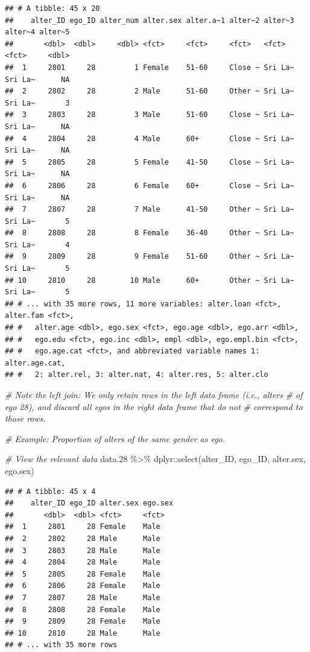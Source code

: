\documentclass[
]{book}
\newenvironment{Shaded}{\begin{snugshade}}{\end{snugshade}}
\newcommand{\CommentTok}[1]{\textcolor[rgb]{0.56,0.35,0.01}{\textit{#1}}}
\newcommand{\FloatTok}[1]{\textcolor[rgb]{0.00,0.00,0.81}{#1}}
\newcommand{\FunctionTok}[1]{\textcolor[rgb]{0.00,0.00,0.00}{#1}}
\newcommand{\NormalTok}[1]{#1}
\newcommand{\SpecialCharTok}[1]{\textcolor[rgb]{0.00,0.00,0.00}{#1}}
\begin{document}
\begin{verbatim}
## # A tibble: 45 x 20
##    alter_ID ego_ID alter_num alter.sex alter.a~1 alter~2 alter~3 alter~4 alter~5
##       <dbl>  <dbl>     <dbl> <fct>     <fct>     <fct>   <fct>   <fct>     <dbl>
##  1     2801     28         1 Female    51-60     Close ~ Sri La~ Sri La~      NA
##  2     2802     28         2 Male      51-60     Other ~ Sri La~ Sri La~       3
##  3     2803     28         3 Male      51-60     Close ~ Sri La~ Sri La~      NA
##  4     2804     28         4 Male      60+       Close ~ Sri La~ Sri La~      NA
##  5     2805     28         5 Female    41-50     Close ~ Sri La~ Sri La~      NA
##  6     2806     28         6 Female    60+       Close ~ Sri La~ Sri La~      NA
##  7     2807     28         7 Male      41-50     Other ~ Sri La~ Sri La~       5
##  8     2808     28         8 Female    36-40     Other ~ Sri La~ Sri La~       4
##  9     2809     28         9 Female    51-60     Other ~ Sri La~ Sri La~       5
## 10     2810     28        10 Male      60+       Other ~ Sri La~ Sri La~       5
## # ... with 35 more rows, 11 more variables: alter.loan <fct>, alter.fam <fct>,
## #   alter.age <dbl>, ego.sex <fct>, ego.age <dbl>, ego.arr <dbl>,
## #   ego.edu <fct>, ego.inc <dbl>, empl <dbl>, ego.empl.bin <fct>,
## #   ego.age.cat <fct>, and abbreviated variable names 1: alter.age.cat,
## #   2: alter.rel, 3: alter.nat, 4: alter.res, 5: alter.clo
\end{verbatim}

\begin{Shaded}
\begin{Highlighting}[]
\CommentTok{\# Note the left join: We only retain rows in the left data frame (i.e., alters}
\CommentTok{\# of ego 28), and discard all egos in the right data frame that do not}
\CommentTok{\# correspond to those rows.}

\CommentTok{\# Example: Proportion of alters of the same gender as ego.}

\CommentTok{\# View the relevant data}
\NormalTok{data}\FloatTok{.28} \SpecialCharTok{\%\textgreater{}\%} 
\NormalTok{  dplyr}\SpecialCharTok{::}\FunctionTok{select}\NormalTok{(alter\_ID, ego\_ID, alter.sex, ego.sex)}
\end{Highlighting}
\end{Shaded}

\begin{verbatim}
## # A tibble: 45 x 4
##    alter_ID ego_ID alter.sex ego.sex
##       <dbl>  <dbl> <fct>     <fct>  
##  1     2801     28 Female    Male   
##  2     2802     28 Male      Male   
##  3     2803     28 Male      Male   
##  4     2804     28 Male      Male   
##  5     2805     28 Female    Male   
##  6     2806     28 Female    Male   
##  7     2807     28 Male      Male   
##  8     2808     28 Female    Male   
##  9     2809     28 Female    Male   
## 10     2810     28 Male      Male   
## # ... with 35 more rows
\end{verbatim}
\end{document}
